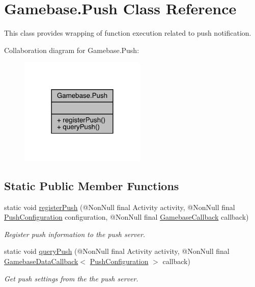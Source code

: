 \hypertarget{classcom_1_1toast_1_1android_1_1gamebase_1_1_gamebase_1_1_push}{}\section{Gamebase.\+Push Class Reference}
\label{classcom_1_1toast_1_1android_1_1gamebase_1_1_gamebase_1_1_push}


This class provides wrapping of function execution related to push notification.  




Collaboration diagram for Gamebase.\+Push\+:
\nopagebreak
\begin{figure}[H]
\begin{center}
\leavevmode
\includegraphics[width=170pt]{classcom_1_1toast_1_1android_1_1gamebase_1_1_gamebase_1_1_push__coll__graph}
\end{center}
\end{figure}
\subsection*{Static Public Member Functions}
\begin{DoxyCompactItemize}
\item 
static void \hyperlink{classcom_1_1toast_1_1android_1_1gamebase_1_1_gamebase_1_1_push_ad8a4f6af1686327bf9af016b38988dff}{register\+Push} (@Non\+Null final Activity activity, @Non\+Null final \hyperlink{classcom_1_1toast_1_1android_1_1gamebase_1_1base_1_1push_1_1_push_configuration}{Push\+Configuration} configuration, @Non\+Null final \hyperlink{interfacecom_1_1toast_1_1android_1_1gamebase_1_1_gamebase_callback}{Gamebase\+Callback} callback)
\begin{DoxyCompactList}\small\item\em Register push information to the push server. \end{DoxyCompactList}\item 
static void \hyperlink{classcom_1_1toast_1_1android_1_1gamebase_1_1_gamebase_1_1_push_a4745e49979a4b9e6867c9361c72e1556}{query\+Push} (@Non\+Null final Activity activity, @Non\+Null final \hyperlink{interfacecom_1_1toast_1_1android_1_1gamebase_1_1_gamebase_data_callback}{Gamebase\+Data\+Callback}$<$ \hyperlink{classcom_1_1toast_1_1android_1_1gamebase_1_1base_1_1push_1_1_push_configuration}{Push\+Configuration} $>$ callback)
\begin{DoxyCompactList}\small\item\em Get push settings from the the push server. \end{DoxyCompactList}\end{DoxyCompactItemize}



